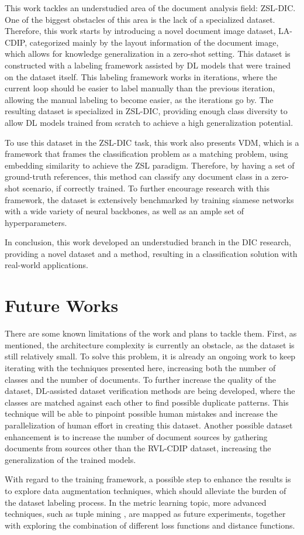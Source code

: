 This work tackles an understudied area of the document analysis field: \gls{ZSL}-\gls{DIC}. One of the biggest obstacles of this area is the lack of a specialized dataset. Therefore, this work starts by introducing a novel document image dataset, \gls{LA-CDIP}, categorized mainly by the layout information of the document image, which allows for knowledge generalization in a zero-shot setting. This dataset is constructed with a labeling framework assisted by \gls{DL} models that were trained on the dataset itself. This labeling framework works in iterations, where the current loop should be easier to label manually than the previous iteration, allowing the manual labeling to become easier, as the iterations go by. The resulting dataset is specialized in \gls{ZSL}-\gls{DIC}, providing enough class diversity to allow \gls{DL} models trained from scratch to achieve a high generalization potential.

To use this dataset in the \gls{ZSL}-\gls{DIC} task, this work also presents \gls{VDM}, which is a framework that frames the classification problem as a matching problem, using embedding similarity to achieve the \gls{ZSL} paradigm. Therefore, by having a set of ground-truth references, this method can classify any document class in a zero-shot scenario, if correctly trained. To further encourage research with this framework, the dataset is extensively benchmarked by training siamese networks with a wide variety of neural backbones, as well as an ample set of hyperparameters.

In conclusion, this work developed an understudied branch in the \gls{DIC} research, providing a novel dataset and a method, resulting in a classification solution with real-world applications.

\section{Future Works}

There are some known limitations of the work and plans to tackle them. First, as mentioned, the architecture complexity is currently an obstacle, as the dataset is still relatively small. To solve this problem, it is already an ongoing work to keep iterating with the techniques presented here, increasing both the number of classes and the number of documents. To further increase the quality of the dataset, \gls{DL}-assisted dataset verification methods are being developed, where the classes are matched against each other to find possible duplicate patterns. This technique will be able to pinpoint possible human mistakes and increase the parallelization of human effort in creating this dataset. Another possible dataset enhancement is to increase the number of document sources by gathering documents from sources other than the RVL-CDIP dataset, increasing the generalization of the trained models.

With regard to the training framework, a possible step to enhance the results is to explore data augmentation techniques, which should alleviate the burden of the dataset labeling process. In the metric learning topic, more advanced techniques, such as tuple mining \cite{schroff_facenet_2015}, are mapped as future experiments, together with exploring the combination of different loss functions and distance functions.
